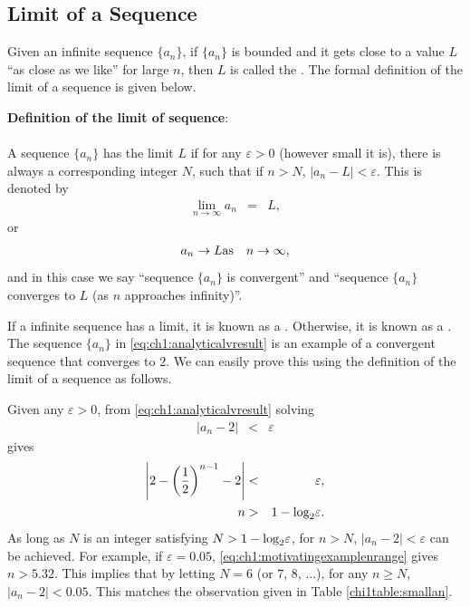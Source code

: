 \subsection{Limit of a Sequence} \label{ch1subsec:definationoflimitofsequence}

Given an infinite sequence $\{a_n\}$, if $\{a_n\}$ is bounded and it gets close to a value $L$ ``as close as we like'' for large $n$, then $L$ is called the . The formal definition of the limit of a sequence is given below.

\begin{VF}
\textbf{Definition of the limit of sequence}:
\\
\\
\noindent A sequence $\{a_n\}$ has the limit $L$ if for any $\varepsilon > 0$ (however small it is), there is always a corresponding integer $N$, such that if $n>N$, $|a_n-L|<\varepsilon$. This is denoted by
\begin{eqnarray}
  \lim_{n\rightarrow \infty} a_n &=& L, \nonumber
\end{eqnarray}
or
\begin{eqnarray}
  a_n \rightarrow L  & \textup{as} & n \rightarrow \infty, \nonumber
\end{eqnarray}
and in this case we say ``sequence $\{a_n\}$ is convergent'' and ``sequence $\{a_n\}$ converges to $L$ (as $n$ approaches infinity)''.
\end{VF}

If a infinite sequence has a limit, it is known as a . Otherwise, it is known as a . The sequence $\{a_n\}$ in \eqref{eq:ch1:analyticalvresult} is an example of a convergent sequence that converges to $2$. We can easily prove this using the definition of the limit of a sequence as follows.

Given any $\varepsilon > 0$, from \eqref{eq:ch1:analyticalvresult} solving
\begin{eqnarray}
  |a_n - 2| &<& \varepsilon \nonumber
\end{eqnarray}
gives
\begin{eqnarray}
  \left|2-\left(\frac{1}{2}\right)^{n-1}-2\right| &<& \varepsilon, \nonumber \\
  n &>& 1-\textup{log}_2\varepsilon. \label{eq:ch1:motivatingexamplenrange}
\end{eqnarray}
As long as $N$ is an integer satisfying $N > 1-\textup{log}_2\varepsilon$, for $n > N$, $|a_n - 2| < \varepsilon$ can be achieved. For example, if $\varepsilon = 0.05$, \eqref{eq:ch1:motivatingexamplenrange} gives $n>5.32$. This implies that by letting $N = 6$ (or $7$, $8$, ...), for any $n \geq N$, $|a_n-2|<0.05$. This matches the observation given in Table \ref{chi1table:smallan}.

